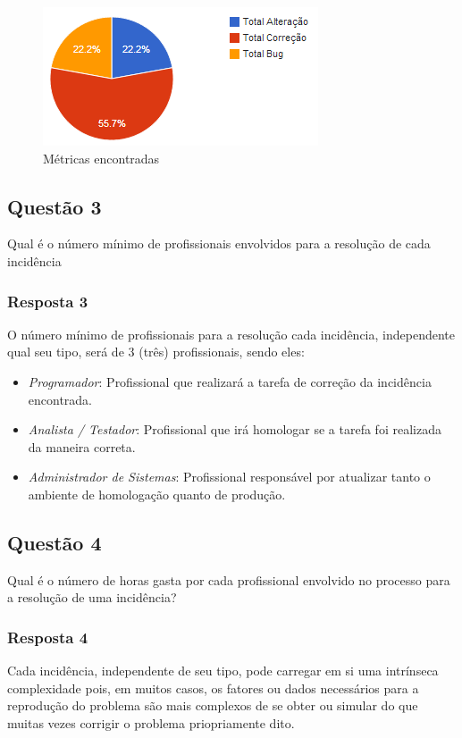\documentclass[11pt, a4paper]{article}
\begin{document}
\begin{figure}[H]
  \caption{Métricas encontradas}
  \centering 
  \includegraphics{images/graphic.png}
\end{figure}
\cite{metricas-sao-silvestre}

\subsection{Questão 3}\label{sec:questao-3}
Qual é o número mínimo de profissionais envolvidos para a resolução de cada incidência
\subsubsection{Resposta 3}
O número mínimo de profissionais para a resolução cada incidência, independente qual seu tipo, será de 3 (três) profissionais, sendo eles:

\begin{itemize}
	\item \textit{Programador}: Profissional que realizará a tarefa de correção da incidência encontrada.
	\item \textit{Analista / Testador}: Profissional que irá homologar se a tarefa foi realizada da maneira correta.
	\item \textit{Administrador de Sistemas}: Profissional responsável por atualizar tanto o ambiente de homologação quanto de produção.
\end{itemize}

\subsection{Questão 4}
Qual é o número de horas gasta por cada profissional envolvido no processo para a resolução de uma incidência?

\subsubsection{Resposta 4}
Cada incidência, independente de seu tipo, pode carregar em si uma intrínseca complexidade pois, em muitos casos, os fatores ou dados necessários  para a reprodução do problema são mais complexos de se obter ou simular do que muitas vezes corrigir o problema priopriamente dito.
\end{document}
